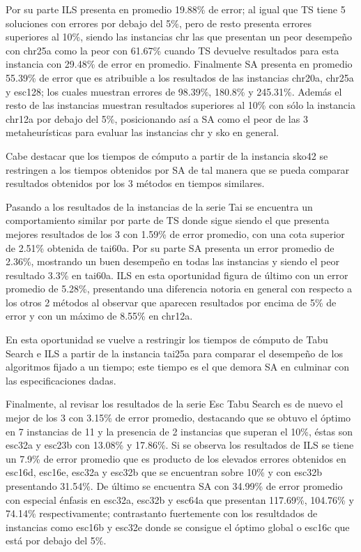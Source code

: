 \documentclass{ci5652}
\begin{document}
Por su parte ILS presenta en promedio 19.88\% de error; al igual que TS tiene 5 soluciones con errores por debajo del 5\%, pero de resto presenta errores superiores al 10\%, siendo las instancias chr las que presentan un peor desempeño con chr25a como la peor con 61.67\% cuando TS devuelve resultados para esta instancia con 29.48\% de error en promedio. Finalmente SA presenta en promedio 55.39\% de error que es atribuible a los resultados de las instancias chr20a, chr25a y esc128; los cuales muestran errores de 98.39\%, 180.8\% y 245.31\%. Además el resto de las instancias muestran resultados superiores al 10\% con sólo la instancia chr12a por debajo del 5\%, posicionando así a SA como el peor de las 3 metaheurísticas para evaluar las instancias chr y sko en general. 

Cabe destacar que los tiempos de cómputo a partir de la instancia sko42 se restringen a los tiempos obtenidos por SA de tal manera que se pueda comparar resultados obtenidos por los 3 métodos en tiempos similares. 

Pasando a los resultados de la instancias de la serie Tai se encuentra un comportamiento similar por parte de TS donde sigue siendo el que presenta mejores resultados de los 3 con 1.59\% de error promedio, con una cota superior de 2.51\% obtenida de tai60a. Por su parte SA presenta un error promedio de 2.36\%, mostrando un buen desempeño en todas las instancias y siendo el peor resultado 3.3\% en tai60a. ILS en esta oportunidad figura de último con un error promedio de 5.28\%, presentando una diferencia notoria en general con respecto a los otros 2 métodos al observar que aparecen resultados por encima de 5\% de error y con un máximo de 8.55\% en chr12a.

En esta oportunidad se vuelve a restringir los tiempos de cómputo de Tabu Search e ILS a partir de la instancia tai25a para comparar el desempeño de los algoritmos fijado a un tiempo; este tiempo es el que demora SA en culminar con las especificaciones dadas.

Finalmente, al revisar los resultados de la serie Esc Tabu Search es de nuevo el mejor de los 3 con 3.15\% de error promedio, destacando que se obtuvo el óptimo en 7 instancias de 11 y la presencia de 2 instancias que superan el 10\%, éstas son esc32a y esc23b con 13.08\% y 17.86\%. Si se observa los resultados de ILS se tiene un 7.9\% de error promedio que es producto de los elevados errores obtenidos en esc16d, esc16e, esc32a y esc32b que se encuentran sobre 10\% y con esc32b presentando 31.54\%. De último se encuentra SA con 34.99\% de error promedio con especial énfasis en esc32a, esc32b y esc64a que presentan 117.69\%, 104.76\% y 74.14\% respectivamente; contrastanto fuertemente con los resultdados de instancias como esc16b y esc32e donde se consigue el óptimo global o esc16c que está por debajo del 5\%.
\end{document}
